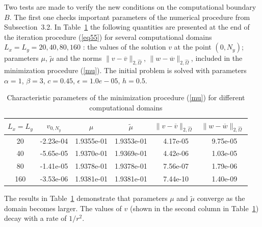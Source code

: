 \documentclass[preprint]{elsarticle}
\newcommand{\rf}[1]{(\ref{#1})}
\def\bar#1{{\overline{#1}}}
\begin{document}
Two tests are made to verify the new  conditions on the computational boundary $B$. The first one checks important parameters of  the numerical procedure from Subsection~3.2. In Table~\ref{tab:b}  the following quantities are presented at the end of the iteration procedure \rf{eq55}  for several computational domains $L_x=L_y=20, 40, 80, 160$ : the values of the solution $v$ at the point $(0,N_y)$; parameters $\mu$,  $\tilde{\mu}$ and the norms $\|v-\bar{v}\|_{2,\hat{\Omega}}$, 
$\|w-\bar{w}\|_{2,\hat{\Omega}}$, included in the minimization procedure \rf{mu}.  The initial problem is solved with  parameters  $\alpha = 1$, $\beta = 3$, $c = 0.45$, $\epsilon = 1.0e-05$, $h = 0.5$.
 \begin{center}
\begin{table}[ht]
\centering
		\begin{tabular}{||c|c|cc|cc||}
			\hline
			\hline
$L_x=L_y$&$v_{0,N_y}$& $\mu$&$\tilde{\mu}$&$\|v-\bar{v}\|_{2,\hat{\Omega}}$&$\|w-\bar{w}\|_{2,\hat{\Omega}}$ \\
	\hline		
              20&-2.23e-04 &1.9355e-01&1.9353e-01&~4.17e-05&~9.75e-05 \\
              40&-5.65e-05 &1.9370e-01&1.9369e-01&~4.42e-06&~1.03e-05 \\
              80&-1.41e-05 &1.9378e-01&1.9378e-01&~7.56e-07&~1.79e-06 \\
            160&-3.53e-06 &1.9381e-01&1.9381e-01&~7.44e-10&~1.40e-09 \\
   \hline
	\hline
		\end{tabular}
		\caption{Characteristic parameters of the minimization procedure \rf{mu} for different computational domains}
\label{tab:b}
\end{table}
\end{center}
The results in Table~\ref{tab:b} demonstrate that  parameters $\mu$ and $\tilde{\mu}$  converge as the domain becomes larger. The values of  $v$ (shown in the second column in  Table~\ref{tab:b}) decay with a rate of $1/r^2$. 
\end{document}
